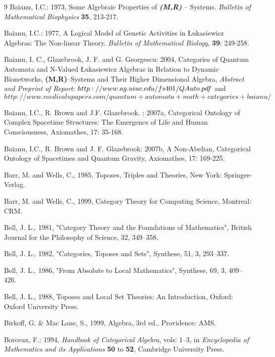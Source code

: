 \documentclass[12pt]{article}
\theoremstyle{plain}
\theoremstyle{definition}
\numberwithin{equation}{section}
\newcommand{\<}{{\langle}}
\begin{document}
\begin{thebibliography} {9}
Baianu, I.C.: 1973, Some Algebraic Properties of \emph{\textbf{(M,R)}} -- Systems. \emph{Bulletin of Mathematical Biophysics} \textbf{35}, 213-217.

Baianu, I.C.: 1977, A Logical Model of Genetic Activities in \L ukasiewicz Algebras: The Non-linear Theory. \emph{Bulletin of Mathematical Biology},
\textbf{39}: 249-258.

Baianu, I. C., Glazebrook, J. F. and G. Georgescu: 2004, Categories of Quantum Automata and N-Valued \L ukasiewicz Algebras in Relation to Dynamic Bionetworks, \textbf{(M,R)}--Systems and Their Higher Dimensional Algebra, \emph{Abstract and Preprint of Report}: $\\http://www.ag.uiuc.edu/fs401/QAuto.pdf $ and $http://www.medicalupapers.com/quantum+automata+math+categories+baianu/$

Baianu, I.C., R. Brown and J.F. Glazebrook. : 2007a, Categorical Ontology of Complex Spacetime Structures: The Emergence of Life and Human Consciousness, Axiomathes, 17: 35-168.

Baianu, I.C.,  R. Brown and J. F. Glazebrook: 2007b, A Non-Abelian, Categorical Ontology of Spacetimes and Quantum Gravity, Axiomathes, 17: 169-225.

Barr, M. and Wells, C., 1985, Toposes, Triples and Theories, New York: Springer-Verlag.
 
Barr, M. and Wells, C., 1999, Category Theory for Computing Science, Montreal: CRM. 

Bell, J. L., 1981, "Category Theory and the Foundations of Mathematics", British Journal for the Philosophy of Science, 32, 349--358. 
 
Bell, J. L., 1982, "Categories, Toposes and Sets", Synthese, 51, 3, 293--337. 
 
Bell, J. L., 1986, "From Absolute to Local Mathematics", Synthese, 69, 3, 409--426. 

Bell, J. L., 1988, Toposes and Local Set Theories: An Introduction, Oxford: Oxford University Press. 

Birkoff, G. \& Mac Lane, S., 1999, Algebra, 3rd ed., Providence: AMS.  

Borceux, F.: 1994, \emph{Handbook of Categorical Algebra}, vols: 1--3, 
in {\em Encyclopedia of Mathematics and its Applications} \textbf{50} to \textbf{52}, Cambridge University Press.


\end{thebibliography}
\end{document}
